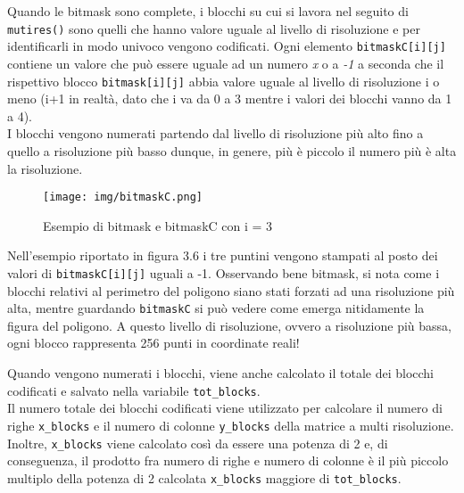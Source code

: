 				Quando le bitmask sono complete, i blocchi su cui si lavora nel seguito di \texttt{mutires()} sono quelli che hanno valore uguale al livello di risoluzione e per identificarli in modo univoco vengono codificati. Ogni elemento \texttt{bitmaskC[i][j]} contiene un valore che pu\`{o} essere uguale ad un numero \textit{x} o a \textit{-1} a seconda che il rispettivo blocco \texttt{bitmask[i][j]} abbia valore uguale al livello di risoluzione i o meno (i+1 in realt\`{a}, dato che i va da 0 a 3 mentre i valori dei blocchi vanno da 1 a 4). \\
				I blocchi vengono numerati partendo dal livello di risoluzione pi\`{u} alto fino a quello a risoluzione pi\`{u} basso dunque, in genere, pi\`{u} \`{e} piccolo il numero pi\`{u} \`{e} alta la risoluzione.
				\begin{figure}[htbp]
					\centering
					\texttt{[image: img/bitmaskC.png]}
					\caption{Esempio di bitmask e bitmaskC con i = 3}
				\end{figure}
				Nell'esempio riportato in figura 3.6 i tre puntini vengono stampati al posto dei valori di \texttt{bitmaskC[i][j]} uguali a -1. Osservando bene bitmask, si nota come i blocchi relativi al perimetro del poligono siano stati forzati ad una risoluzione pi\`{u} alta, mentre guardando \texttt{bitmaskC} si pu\`{o} vedere come emerga nitidamente la figura del poligono. A questo livello di risoluzione, ovvero a risoluzione pi\`{u} bassa, ogni blocco rappresenta 256 punti in coordinate reali!

				Quando vengono numerati i blocchi, viene anche calcolato il totale dei blocchi codificati e salvato nella variabile \texttt{tot\_blocks}. \\
				Il numero totale dei blocchi codificati viene utilizzato per calcolare il numero di righe \texttt{x\_blocks} e il numero di colonne \texttt{y\_blocks} della matrice a multi risoluzione. Inoltre, \texttt{x\_blocks} viene calcolato cos\`{i} da essere una potenza di 2 e, di conseguenza, il prodotto fra numero di righe e numero di colonne \`{e} il pi\`{u} piccolo multiplo della potenza di 2 calcolata \texttt{x\_blocks} maggiore di \texttt{tot\_blocks}. 

